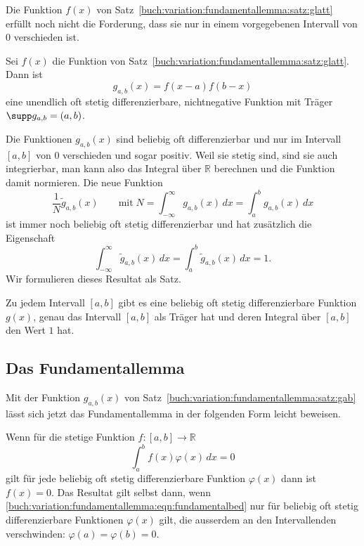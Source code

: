 Die Funktion $f(x)$ von 
Satz~\ref{buch:variation:fundamentallemma:satz:glatt} 
erfüllt noch nicht die Forderung, dass sie nur in einem vorgegebenen
Intervall von $0$ verschieden ist.



\begin{satz}
\label{buch:variation:fundamentallemma:satz:gab}
Sei $f(x)$ die Funktion von
Satz~\ref{buch:variation:fundamentallemma:satz:glatt}.
Dann ist
\[
g_{a,b}(x)
=
f(x-a) f(b-x)
\]
eine unendlich oft stetig differenzierbare, nichtnegative Funktion mit Träger
$\supp g_{a,b}=(a,b)$.
\end{satz}

Die Funktionen $g_{a,b}(x)$ sind beliebig oft differenzierbar und nur im
Intervall $[a,b]$ von $0$ verschieden und sogar positiv.
Weil sie stetig sind, sind sie auch integrierbar, man kann also das
Integral über $\mathbb{R}$ berechnen und die Funktion damit normieren.
Die neue Funktion
\[
\frac{1}{N}
\tilde{g}_{a,b}(x)
\qquad\text{mit}\;
N
=
\int_{-\infty}^{\infty}g_{a,b}(x)\,dx
=
\int_a^b g_{a,b}(x)\,dx
\]
ist immer noch beliebig oft stetig differenzierbar und hat zusätzlich die
Eigenschaft
\[
\int_{-\infty}^{\infty}
\tilde{g}_{a,b}(x)\,dx
=
\int_a^b
\tilde{g}_{a,b}(x)\,dx
=
1.
\]
Wir formulieren dieses Resultat als Satz.

\begin{satz}
\label{buch:variation:satz:gabeins}
Zu jedem Intervall $[a,b]$ gibt es eine beliebig oft stetig
differenzierbare Funktion $g(x)$, genau das Intervall $[a,b]$
als Träger hat und deren Integral über $[a,b]$ den Wert $1$ hat.
\end{satz}

%
%
\subsection{Das Fundamentallemma}
Mit der Funktion $g_{a,b}(x)$ von
Satz~\ref{buch:variation:fundamentallemma:satz:gab}
lässt sich jetzt das Fundamentallemma in der folgenden Form
leicht beweisen.

\begin{satz}[Fundamentallemma]
\label{buch:variation:fundamentallemma:satz:fundamentallemma}
Wenn für die stetige Funktion $f\colon[a,b]\to\mathbb{R}$ 
\begin{equation}
\int_a^b f(x)\varphi(x)\,dx = 0
\label{buch:variation:fundamentallemma:eqn:fundamentalbed}
\end{equation}
gilt für jede beliebig oft stetig differenzierbare Funktion $\varphi(x)$ 
dann ist $f(x)=0$.
Das Resultat gilt selbst dann, wenn
\eqref{buch:variation:fundamentallemma:eqn:fundamentalbed}
nur für beliebig oft stetig differenzierbare Funktionen $\varphi(x)$ 
gilt, die ausserdem an den Intervallenden verschwinden:
$\varphi(a)=\varphi(b)=0$.
\end{satz}

